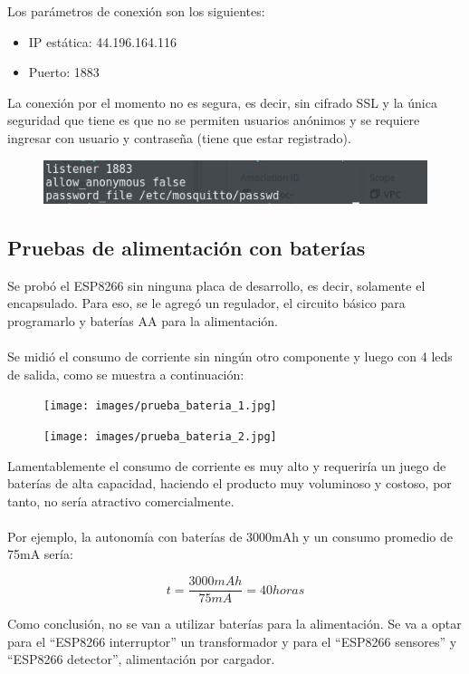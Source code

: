\documentclass[oneside]{article}
\begin{document}
Los parámetros de conexión son los siguientes:
\begin{itemize}
\item IP estática: 44.196.164.116
\item Puerto: 1883
\end{itemize}


La conexión por el momento no es segura, es decir, sin cifrado SSL y la única seguridad que tiene es que no se permiten usuarios anónimos y se requiere ingresar con usuario y contraseña (tiene que estar registrado).
\begin{figure}[H]
\centering
\includegraphics[scale=1]{images/conf_inicial_broker.jpg}
\end{figure}

\subsection*{Pruebas de alimentación con baterías}
Se probó el ESP8266 sin ninguna placa de desarrollo, es decir, solamente el encapsulado. Para eso, se le agregó un regulador, el circuito básico para programarlo y baterías AA para la alimentación.\\\\
Se midió el consumo de corriente sin ningún otro componente y luego con 4 leds de salida, como se muestra a continuación:
	
\begin{figure}[H]
\centering
\texttt{[image: images/prueba\_bateria\_1.jpg]}
\end{figure}

\begin{figure}[H]
\centering
\texttt{[image: images/prueba\_bateria\_2.jpg]}
\end{figure}

Lamentablemente el consumo de corriente es muy alto y requeriría un juego de baterías de alta capacidad, haciendo el producto muy voluminoso y costoso, por tanto, no sería atractivo comercialmente. 
\\\\
Por ejemplo, la autonomía con baterías de 3000mAh y un consumo promedio de 75mA sería:

$$t = \frac{3000mAh}{75mA}=40horas$$

Como conclusión, no se van a utilizar baterías para la alimentación. Se va a optar para el ``ESP8266 interruptor'' un transformador y para el ``ESP8266 sensores'' y ``ESP8266 detector'', alimentación por cargador.
\end{document}
